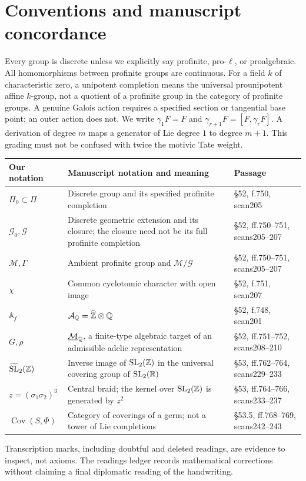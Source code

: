 \section*{Conventions and manuscript concordance}
Every group is discrete unless we explicitly say profinite, pro-$\ell$, or
proalgebraic. All homomorphisms between profinite groups are continuous.
For a field $k$ of characteristic zero, a unipotent completion means the
universal prounipotent affine $k$-group, not a quotient of a profinite group
in the category of profinite groups. A genuine Galois action requires a
specified section or tangential base point; an outer action does not.
We write $\gamma_1 F=F$ and $\gamma_{r+1}F=[F,\gamma_rF]$.
A derivation of degree $m$ maps a generator of Lie degree $1$ to degree $m+1$.
This grading must not be confused with twice the motivic Tate weight.

\begin{longtable}{p{}p{}p{}}
\toprule Our notation & Manuscript notation and meaning & Passage\\\midrule
$\Pi_0\subset\Pi$ & Discrete group and its specified profinite completion & \S52, f.750, scan205\\
$\mathcal G_0,\mathcal G$ & Discrete geometric extension and its closure; the closure need not be its full profinite completion & \S52, ff.750--751, scans205--207\\
$\mathcal M,\Gamma$ & Ambient profinite group and $\mathcal M/\mathcal G$ & \S52, ff.750--751, scans205--207\\
$\chi$ & Common cyclotomic character with open image & \S52, f.751, scan207\\
$\mathbb A_f$ & $\mathcal A_\mathbb Q=\widehat{\mathbb Z}\otimes\mathbb Q$ & \S52, f.748, scan201\\
$G,\rho$ & $\underline{\mathcal M}_\mathbb Q$, a finite-type algebraic target of an admissible adelic representation & \S52, ff.751--752, scans208--210\\
$\widetilde{\operatorname{SL}}_2(\mathbb Z)$ & Inverse image of $\operatorname{SL}_2(\mathbb Z)$ in the universal covering group of $\operatorname{SL}_2(\mathbb R)$ & \S53, ff.762--764, scans229--233\\
$z=(\sigma_1\sigma_2)^3$ & Central braid; the kernel over $\operatorname{SL}_2(\mathbb Z)$ is generated by $z^2$ & \S53, ff.764--766, scans233--237\\
$\operatorname{Cov}(S,\Phi)$ & Category of coverings of a germ; not a tower of Lie completions & \S53.5, ff.768--769, scans242--243\\
\bottomrule
\end{longtable}
Transcription marks, including doubtful and deleted readings, are evidence
to inspect, not axioms. The readings ledger records mathematical corrections
without claiming a final diplomatic reading of the handwriting.
